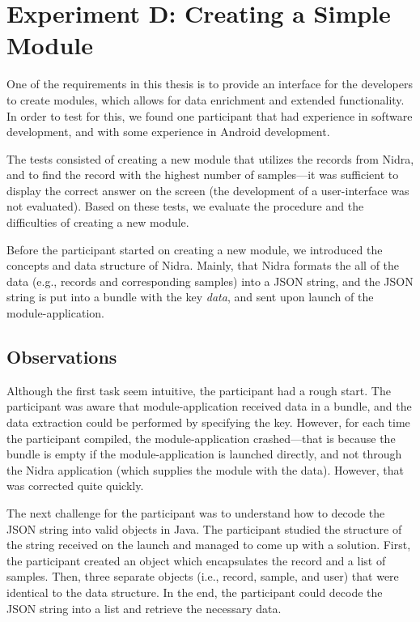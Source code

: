 \section{Experiment D: Creating a Simple Module}
One of the requirements in this thesis is to provide an interface for the developers to create modules, which allows for data enrichment and extended functionality. In order to test for this, we found one participant that had experience in software development, and with some experience in Android development.

 The tests consisted of creating a new module that utilizes the records from Nidra, and to find the record with the highest number of samples---it was sufficient to display the correct answer on the screen (the development of a user-interface was not evaluated). Based on these tests, we evaluate the procedure and the difficulties of creating a new module. 

Before the participant started on creating a new module, we introduced the concepts and data structure of Nidra. Mainly, that Nidra formats the all of the data (e.g., records and corresponding samples) into a JSON string, and the JSON string is put into a bundle with the key \textit{data}, and sent upon launch of the module-application. 


\subsection{Observations}
Although the first task seem intuitive, the participant had a rough start. The participant was aware that module-application received data in a bundle, and the data extraction could be performed by specifying the key. However, for each time the participant compiled, the module-application crashed---that is because the bundle is empty if the module-application is launched directly, and not through the Nidra application (which supplies the module with the data). However, that was corrected quite quickly. 

The next challenge for the participant was to understand how to decode the JSON string into valid objects in Java. The participant studied the structure of the string received on the launch and managed to come up with a solution. First, the participant created an object which encapsulates the record and a list of samples. Then, three separate objects (i.e., record, sample, and user) that were identical to the data structure. In the end, the participant could decode the JSON string into a list and retrieve the necessary data.

